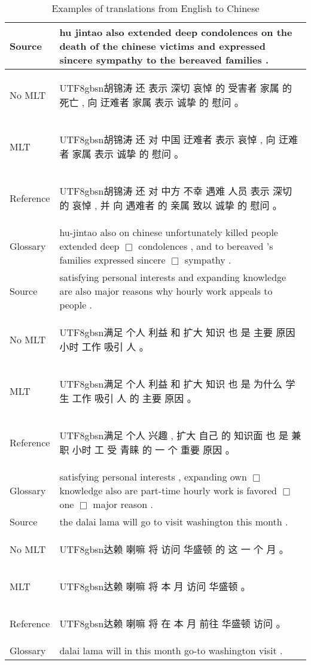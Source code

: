 \documentclass[a4paper]{article}
\newcommand{\cntext}[1]{\begin{CJK}{UTF8}{gbsn}#1\end{CJK}}
\begin{document}
\begin{table*}
\centering
\begin{tabular}{|l|m{}|} \hline
Source & hu jintao also extended deep condolences on the death of the chinese victims and expressed sincere sympathy to the bereaved families .
\\ \hline
No MLT & \cntext{胡锦涛 还 表示 深切 哀悼 的 受害者 家属 的 死亡 , 向 迂难者 家属 表示 诚挚 的 慰问 。} \\ \hline
MLT & \cntext{胡锦涛 还 对 中国 迂难者 表示 哀悼 , 向 迂难者 家属 表示 诚挚 的 慰问 。} \\ \hline 
Reference & \cntext{胡锦涛 还 对 中方 不幸 遇难 人员 表示 深切 的 哀悼 , 并 向 遇难者 的 亲属 致以 诚挚 的 慰问 。} \\ \hline
Glossary & hu-jintao also on chinese unfortunately killed people extended deep $\Box$ condolences , and to bereaved 's families expressed sincere $\Box$ sympathy .
\\ \hline \hline
Source & satisfying personal interests and expanding knowledge are also major reasons why hourly work appeals to people .\\ \hline
No MLT & \cntext{满足 个人 利益 和 扩大 知识 也 是 主要 原因 小时 工作 吸引 人 。} \\ \hline
MLT & \cntext{满足 个人 利益 和 扩大 知识 也 是 为什么 学生 工作 吸引 人 的 主要 原因 。} \\ \hline 
Reference & \cntext{满足 个人 兴趣 , 扩大 自己 的 知识面 也 是 兼职 小时 工 受 青睐 的 一 个 重要 原因 。}  \\ \hline
Glossary & satisfying personal interests , expanding own $\Box$ knowledge also are part-time hourly work is favored $\Box$ one $\Box$ major reason .
\\ \hline \hline

Source & the dalai lama will go to visit washington this month .\\ \hline
No MLT & \cntext{达赖 喇嘛 将 访问 华盛顿 的 这 一 个 月 。} \\ \hline
MLT & \cntext{达赖 喇嘛 将 本 月 访问 华盛顿 。} \\ \hline
Reference & \cntext{达赖 喇嘛 将 在 本 月 前往 华盛顿 访问 。} \\ \hline
Glossary & dalai lama will in this month go-to washington visit .
\\ \hline
\end{tabular}
\caption{Examples of translations from English to Chinese}
\label{t2}
\end{table*}
\end{document}
